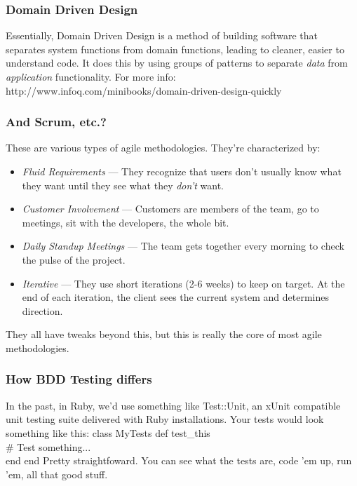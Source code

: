 \documentclass[t, 10pt]{beamer}
\begin{document}
\begin{frame}
\frametitle{Domain Driven Design}
Essentially, Domain Driven Design is a method of building software that separates system functions from domain functions, leading to cleaner, easier to understand code.
\newline
\newline
 It does this by using groups of patterns to separate \textit{data} from \textit{application} functionality.
\newline
\newline
For more info: http://www.infoq.com/minibooks/domain-driven-design-quickly
\end{frame}

\begin{frame}
\frametitle{And Scrum, etc.?}
These are various types of agile methodologies.  They're characterized by:
\begin{itemize}
\item \textit{Fluid Requirements} --- They recognize that users don't usually know what they want until they see what they \textit{don't} want.
\item \textit{Customer Involvement} --- Customers are members of the team, go to meetings, sit with the developers, the whole bit.
\item \textit{Daily Standup Meetings} --- The team gets together every morning to check the pulse of the project.
\item \textit{Iterative} --- They use short iterations (2-6 weeks) to keep on target.  At the end of each iteration, the client sees the current system and determines direction.
\end{itemize}
They all have tweaks beyond this, but this is really the core of most agile methodologies.
\end{frame}

\begin{frame}
\frametitle{How BDD Testing differs}
In the past, in Ruby, we'd use something like Test::Unit, an xUnit compatible unit testing suite delivered with Ruby installations.  Your tests would look something like this:
\newline
\newline
class MyTests
\newline
\newline
def test\_this \\
    \# Test something... \\
end
\newline
\newline
end
\newline
\newline
Pretty straightfoward.  You can see what the tests are, code 'em up, run 'em, all that good stuff.
\end{frame}
\end{document}
